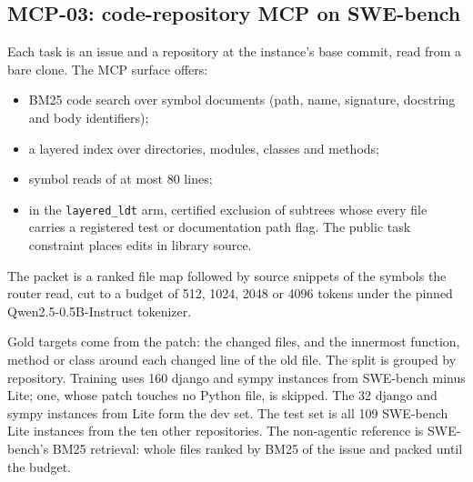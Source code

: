 \subsection{MCP-03: code-repository MCP on SWE-bench}
Each task is an issue and a repository at the instance's base commit, read from a bare clone. The MCP surface offers:
\begin{itemize}
\item BM25 code search over symbol documents (path, name, signature, docstring and body identifiers);
\item a layered index over directories, modules, classes and methods;
\item symbol reads of at most 80 lines;
\item in the \texttt{layered\_ldt} arm, certified exclusion of subtrees whose every file carries a registered test or
documentation path flag. The public task constraint places edits in library source.
\end{itemize}
The packet is a ranked file map followed by source snippets of the symbols the router read, cut to a budget of
512, 1024, 2048 or 4096 tokens under the pinned Qwen2.5-0.5B-Instruct tokenizer.

Gold targets come from the patch: the changed files, and the innermost function, method or class around each
changed line of the old file. The split is grouped by repository. Training uses 160 django and sympy instances from
SWE-bench minus Lite; one, whose patch touches no Python file, is skipped. The 32 django and sympy instances from Lite
form the dev set. The test set is all 109 SWE-bench Lite
instances from the ten other repositories. The non-agentic reference is SWE-bench's BM25 retrieval: whole files
ranked by BM25 of the issue and packed until the budget.
